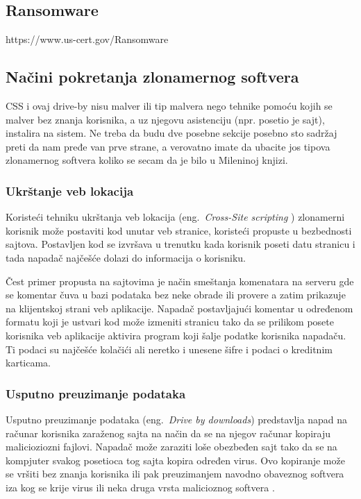\documentclass[a4paper]{article}
\begin{document}
\subsection{Ransomware}
https://www.us-cert.gov/Ransomware

\subsection{Načini pokretanja zlonamernog softvera}

CSS i ovaj drive-by nisu malver ili tip malvera nego tehnike pomoću kojih se malver bez znanja korisnika, a uz njegovu asistenciju (npr. posetio je sajt), instalira na sistem. Ne treba da budu dve posebne sekcije posebno sto sadržaj preti da nam pređe van prve strane, a verovatno imate da ubacite jos tipova zlonamernog softvera koliko se secam da je bilo u Mileninoj knjizi.

\subsubsection{Ukrštanje veb lokacija}

Koristeći tehniku ukrštanja veb lokacija (eng.~{\em Cross-Site scripting }) zlonamerni korisnik može postaviti kod unutar veb stranice, koristeći propuste u bezbednosti sajtova. Postavljen kod se izvršava u trenutku kada korisnik poseti datu stranicu i tada napadač najčešće dolazi do informacija o korisniku. \cite{ethics,xss}

Čest primer propusta na sajtovima je način smeštanja komenatara na serveru gde se komentar čuva u bazi podataka bez neke obrade ili provere a zatim prikazuje na klijentskoj strani veb aplikacije. Napadač postavljajući komentar u određenom formatu koji je ustvari kod može izmeniti stranicu tako da se prilikom posete korisnika veb aplikacije aktivira program koji šalje podatke korisnika napadaču. Ti podaci su najčešće kolačići ali neretko i unesene šifre i podaci o kreditnim karticama. \cite{xss}



\subsubsection{Usputno preuzimanje podataka }

Usputno preuzimanje podataka (eng.~{\em Drive by downloads}) predstavlja napad na računar korisnika zaraženog sajta na način da se 
na njegov računar kopiraju malicioziozni fajlovi. Napadač može zaraziti loše obezbeđen sajt tako da se na kompjuter svakog posetioca tog sajta kopira određen virus. Ovo kopiranje može se vršiti bez znanja korisnika ili pak preuzimanjem navodno obaveznog softvera iza kog se krije virus ili neka druga vrsta malicioznog softvera \cite{drivebydownloads, ethics}.
\end{document}
